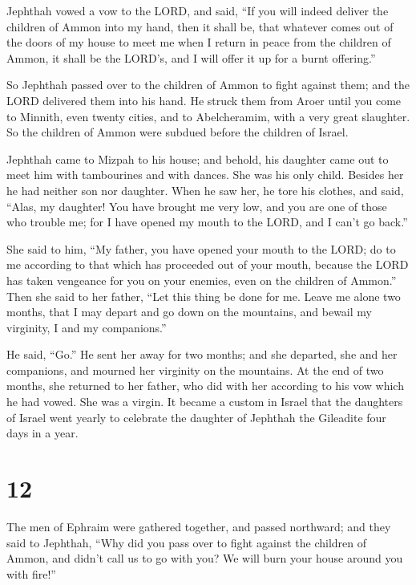  Jephthah vowed a vow to the LORD, and said, ``If you will
indeed deliver the children of Ammon into my hand,  then it
shall be, that whatever comes out of the doors of my house to meet me
when I return in peace from the children of Ammon, it shall be the
LORD's, and I will offer it up for a burnt offering.''

 So Jephthah passed over to the children of Ammon to fight
against them; and the LORD delivered them into his hand. 
He struck them from Aroer until you come to Minnith, even twenty cities,
and to Abelcheramim, with a very great slaughter. So the children of
Ammon were subdued before the children of Israel.

 Jephthah came to Mizpah to his house; and behold, his
daughter came out to meet him with tambourines and with dances. She was
his only child. Besides her he had neither son nor daughter.
 When he saw her, he tore his clothes, and said, ``Alas, my
daughter! You have brought me very low, and you are one of those who
trouble me; for I have opened my mouth to the LORD, and I can't go
back.''

 She said to him, ``My father, you have opened your mouth
to the LORD; do to me according to that which has proceeded out of your
mouth, because the LORD has taken vengeance for you on your enemies,
even on the children of Ammon.''  Then she said to her
father, ``Let this thing be done for me. Leave me alone two months, that
I may depart and go down on the mountains, and bewail my virginity, I
and my companions.''

 He said, ``Go.'' He sent her away for two months; and she
departed, she and her companions, and mourned her virginity on the
mountains.  At the end of two months, she returned to her
father, who did with her according to his vow which he had vowed. She
was a virgin. It became a custom in Israel  that the
daughters of Israel went yearly to celebrate the daughter of Jephthah
the Gileadite four days in a year.

\hypertarget{section-11}{%
\section{12}\label{section-11}}

 The men of Ephraim were gathered together, and passed
northward; and they said to Jephthah, ``Why did you pass over to fight
against the children of Ammon, and didn't call us to go with you? We
will burn your house around you with fire!''

